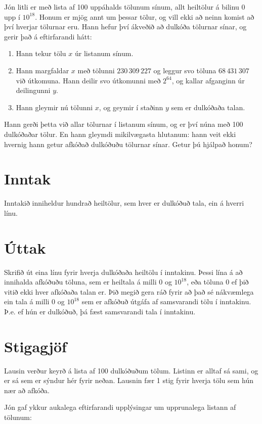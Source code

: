 
Jón litli er með lista af 100 uppáhalds tölunum sínum, allt heiltölur á bilinu
$0$ upp í $10^{18}$. Honum er mjög annt um þessar tölur, og vill ekki að neinn
komist að því hverjar tölurnar eru. Hann hefur því ákveðið að dulkóða tölurnar
sínar, og gerir það á eftirfarandi hátt:

\begin{enumerate}
    \item Hann tekur tölu $x$ úr listanum sínum.
    \item Hann margfaldar $x$ með tölunni $230\,309\,227$ og leggur svo töluna
        $68\,431\,307$ við útkomuna. Hann deilir svo útkomunni með $2^{64}$, og
        kallar afganginn úr deilingunni $y$.
    \item Hann gleymir nú tölunni $x$, og geymir í staðinn $y$ sem er dulkóðaða talan.
\end{enumerate}

Hann gerði þetta við allar tölurnar í listanum sínum, og er því núna með 100
dulkóðaðar tölur. En hann gleymdi mikilvægasta hlutanum: hann veit ekki hvernig
hann getur afkóðað dulkóðuðu tölurnar sínar. Getur þú hjálpað honum?

\section*{Inntak}
Inntakið inniheldur hundrað heiltölur, sem hver er dulkóðuð tala, ein á hverri
línu.

\section*{Úttak}
Skrifið út eina línu fyrir hverja dulkóðaða heiltölu í inntakinu. Þessi lína á
að innihalda afkóðuðu töluna, sem er heiltala á milli $0$ og $10^{18}$, eða
töluna $0$ ef þið vitið ekki hver afkóðaða talan er. Þið megið gera ráð fyrir
að það sé nákvæmlega ein tala á milli $0$ og $10^{18}$ sem er afkóðuð útgáfa af
samsvarandi tölu í inntakinu. Þ.e. ef hún er dulkóðuð, þá fæst samsvarandi
tala í inntakinu.

\section*{Stigagjöf}
Lausin verður keyrð á lista af 100 dulkóðuðum tölum. Listinn er alltaf sá sami,
og er sá sem er sýndur hér fyrir neðan. Lausnin fær 1 stig fyrir hverja tölu
sem hún nær að afkóða.

Jón gaf ykkur aukalega eftirfarandi upplýsingar um upprunalega listann af
tölunum:

